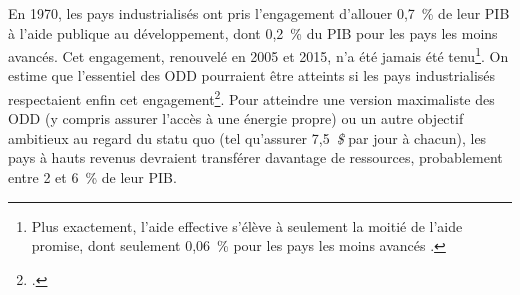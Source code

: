 \documentclass[a5paper,french,openany]{memoir}
\begin{document}
En 1970, les pays industrialisés ont pris l'engagement d'allouer 0,7~\% de leur PIB à l'aide publique au développement, dont 0,2~\% du PIB pour les pays les moins avancés. Cet engagement, renouvelé en 2005 et 2015, n'a été jamais été tenu\footnote{Plus exactement, l'aide effective s'élève à seulement la moitié de l'aide promise, dont seulement 0,06~\% pour les pays les moins avancés %
\citep{oecd_oda_2023}.}. %
On estime que l'essentiel des ODD pourraient être atteints si les pays industrialisés respectaient enfin cet engagement\footnote{\citet{sdsn_sdg_2019}.}. Pour atteindre une version maximaliste des ODD (y compris assurer l'accès à une énergie propre) ou un autre objectif ambitieux au regard du statu quo (tel qu'assurer 7,5~\textit{\$} par jour à chacun), les pays à hauts revenus devraient transférer davantage de ressources, probablement entre 2 et 6~\% de leur PIB. %
\end{document}
